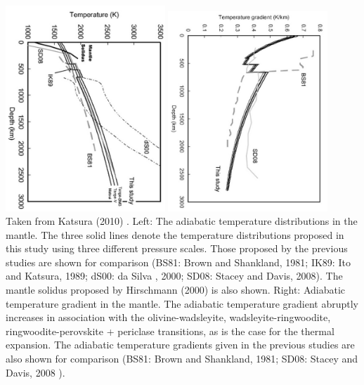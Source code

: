 \begin{center}
\includegraphics[width=6cm]{images/adiabatic/kayy10a}
\includegraphics[width=6cm]{images/adiabatic/kayy10b}\\
{\captionfont Taken from Katsura \etal (2010) \cite{kayy10}.
Left: The adiabatic temperature distributions in the mantle. The three solid lines
denote the temperature distributions proposed in this study using three different
pressure scales. Those proposed by the previous studies are shown for comparison
(BS81: Brown and Shankland, 1981; IK89: Ito and Katsura, 1989; dS00: da Silva \etal,
2000; SD08: Stacey and Davis, 2008). The mantle solidus proposed by Hirschmann
(2000) is also shown.
Right:
Adiabatic temperature gradient in the mantle. The adiabatic temperature gradient 
abruptly increases in association with the olivine-wadsleyite,
wadsleyite-ringwoodite, ringwoodite-perovskite + periclase transitions, as is the
case for the thermal expansion. The adiabatic temperature gradients given in the
previous studies are also shown for comparison (BS81: Brown and Shankland, 1981;
SD08: Stacey and Davis, 2008 \cite{stacey_davis}).
}
\end{center}


